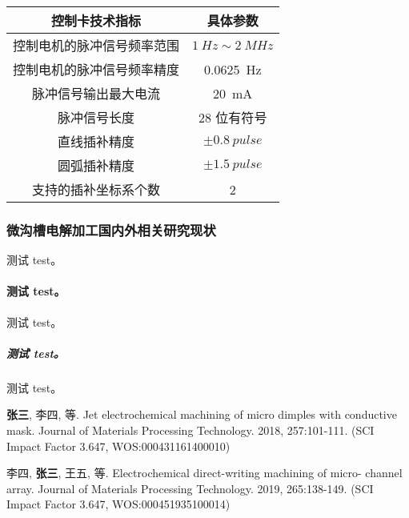 \documentclass[
  type=master
]{gdutthesis}
\begin{document}
\begin{table}
  \label{tab:example}
  \begin{tabular}{cc}
    \toprule
    控制卡技术指标              & 具体参数                      \\
    \midrule
    控制电机的脉冲信号频率范围  & $\SI{1}{Hz}\sim\SI{2}{MHz}$ \\
    控制电机的脉冲信号频率精度  & \SI{0.0625}{Hz}              \\
    脉冲信号输出最大电流        & \SI{20}{mA}                  \\
    脉冲信号长度                & 28 位有符号                   \\
    直线插补精度                & $\pm \SI{0.8}{pulse}$        \\
    圆弧插补精度                & $\pm \SI{1.5}{pulse}$        \\
    支持的插补坐标系个数        & 2                             \\
    \bottomrule
  \end{tabular}
\end{table}


\subsubsection{微沟槽电解加工国内外相关研究现状}
测试 test。
\paragraph{测试 test。}
测试 test。
\subparagraph{测试 test。}
测试 test\cite{woerdelun2012jingji}。

\gdutbackmatter
{}
\zhlipsum[1]

\zhlipsum[1]

\nocite{*}%
\printbibliography



\begin{results}
  \item \textbf{张三}, 李四, 等. Jet electrochemical machining of micro dimples with conductive mask.
  Journal of Materials Processing Technology. 2018, 257:101-111. (SCI Impact Factor 3.647,
  WOS:000431161400010)
  \item 李四, \textbf{张三}, 王五, 等. Electrochemical direct-writing machining of micro- channel array.
  Journal of Materials Processing Technology. 2019, 265:138-149. (SCI Impact Factor 3.647,
  WOS:000451935100014)
\end{results}
\end{document}
